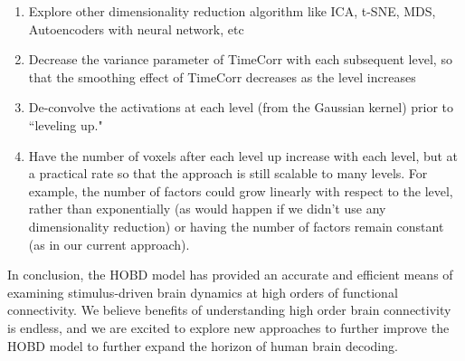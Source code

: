 \documentclass[11pt]{article}
\begin{document}
\begin{enumerate}
\item Explore other dimensionality reduction algorithm like ICA, t-SNE, MDS, Autoencoders with neural network, etc
\item Decrease the variance parameter of TimeCorr with each subsequent level, so that the smoothing effect of TimeCorr decreases as the level increases
\item De-convolve the activations at each level (from the Gaussian kernel) prior to ``leveling up."
\item Have the number of voxels after each level up increase with each level, but at a practical rate so that the approach is still scalable to many levels. For example, the number of factors could grow linearly with respect to the level, rather than exponentially (as would happen if we didn't use any dimensionality reduction) or having the number of factors remain constant (as in our current approach).
\end{enumerate}

In conclusion, the HOBD model has provided an accurate and efficient means of examining stimulus-driven brain dynamics at high orders of functional connectivity. We believe benefits of understanding high order brain connectivity is endless, and we are excited to explore new approaches to further improve the HOBD model to further expand the horizon of human brain decoding.
\end{document}

